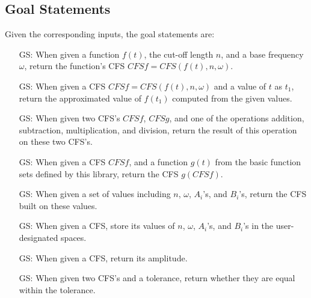 \documentclass[12pt]{article}
\newcounter{goalnum} %
\begin{document}
\subsection{Goal Statements}

\noindent Given the corresponding inputs, the goal statements are:

\begin{itemize}

\item[GS\refstepcounter{goalnum}\thegoalnum \label{GS:ConvertFromFunc}:] 
When given a function $f(t)$, the cut-off length $n$, and a base frequency 
$\omega$, return the function's CFS $\mathit{CFSf}=\mathit{CFS}(f(t), n, \omega)$.
\item[GS\refstepcounter{goalnum}\thegoalnum \label{GS:FuncValue}:] 
When given a CFS $\mathit{CFSf}=\mathit{CFS}(f(t), n, \omega)$ and a value of $t$ as $t_1$, 
return the approximated value of $f(t_1)$ computed from the given values.
\item[GS\refstepcounter{goalnum}\thegoalnum \label{GS:Operation}:] 
When given two CFS's $\mathit{CFSf}$, $\mathit{CFSg}$, and one of the 
operations addition, subtraction, multiplication, and division, return 
the result of this operation on these two CFS's.
\item[GS\refstepcounter{goalnum}\thegoalnum \label{GS:Function}:] 
When given a CFS $\mathit{CFSf}$, and a function $g(t)$ from the basic 
function sets defined by this library, return the CFS $g(CFSf)$. 
 
\item[GS\refstepcounter{goalnum}\thegoalnum \label{GS:ConvertFromOther}:] 
When given a set of values including $n$, $\omega$, $A_i$'s, and $B_i$'s, 
return the CFS built on these values.
\item[GS\refstepcounter{goalnum}\thegoalnum \label{GS:ConvertToOther}:] 
When given a CFS, store its values of $n$, $\omega$, $A_i$'s, and $B_i$'s 
in the user-designated spaces.
\item[GS\refstepcounter{goalnum}\thegoalnum \label{GS:Amp}:] When given 
a CFS, return its amplitude.
\item[GS\refstepcounter{goalnum}\thegoalnum \label{GS:ToleratedEquality}:] 
When given two CFS's and a tolerance, return whether they are equal 
within the tolerance.
\end{itemize}
\end{document}

